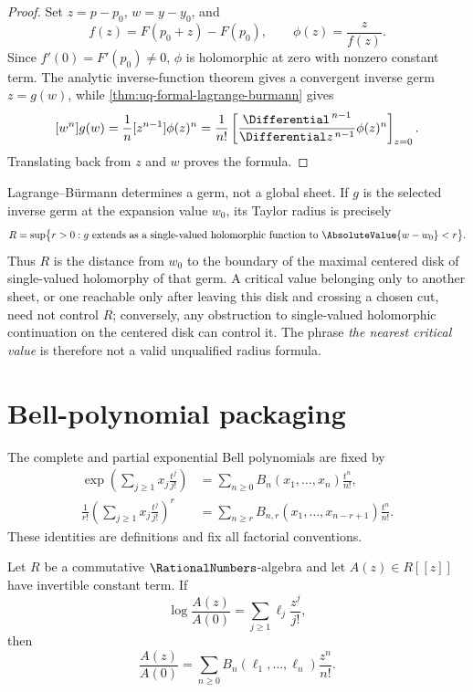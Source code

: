 \begin{proof}
Set \(z=p-p_0\), \(w=y-y_0\), and
\[
 f(z)=F(p_0+z)-F(p_0),\qquad \phi(z)=\frac{z}{f(z)}.
\]
Since \(f'(0)=F'(p_0)\ne0\), \(\phi\) is holomorphic at zero with nonzero
constant term.  The analytic inverse-function theorem gives a convergent
inverse germ \(z=g(w)\), while
\cref{thm:uq-formal-lagrange-burmann} gives
\[
 [w^n]g(w)=\frac1n[z^{n-1}]\phi(z)^n
 =\frac1{n!}\left[\frac{\Differential^{\,n-1}}{\Differential z^{\,n-1}}
 \phi(z)^n\right]_{z=0}.
\]
Translating back from \(z\) and \(w\) proves the formula.
\end{proof}

\begin{warning}
\label{warn:uq-inverse-radius}
Lagrange--B\"urmann determines a germ, not a global sheet.  If $g$ is the
selected inverse germ at the expansion value $w_0$, its Taylor radius is
precisely
\[
 R=\sup\bigl\{r>0:g\text{ extends as a single-valued holomorphic function to
 }\AbsoluteValue{w-w_0}<r\bigr\}.
\]
Thus $R$ is the distance from $w_0$ to the boundary of the maximal centered
disk of single-valued holomorphy of that germ.  A critical value belonging
only to another sheet, or one reachable only after leaving this disk and
crossing a chosen cut, need not control $R$; conversely, any obstruction to
single-valued holomorphic continuation on the centered disk can control it.
The phrase \emph{the nearest critical value} is therefore not a valid
unqualified radius formula.
\end{warning}

\section{Bell-polynomial packaging}
\label{sec:uq-bell-packaging}

The complete and partial exponential Bell polynomials are fixed by
\begin{align}
 \exp\!\left(\sum_{j\ge1}x_j\frac{t^j}{j!}\right)
 &=\sum_{n\ge0}B_n(x_1,\ldots,x_n)\frac{t^n}{n!},
 \label{eq:uq-complete-bell-definition}\\
 \frac1{r!}\left(\sum_{j\ge1}x_j\frac{t^j}{j!}\right)^{\!r}
 &=\sum_{n\ge r}B_{n,r}(x_1,\ldots,x_{n-r+1})
   \frac{t^n}{n!}.
 \label{eq:uq-partial-bell-definition}
\end{align}
These identities are definitions and fix all factorial conventions.

\begin{lemma}
\label{lem:uq-bell-exponentiation}
Let \(R\) be a commutative \(\RationalNumbers\)-algebra and let \(A(z)\in R[[z]]\) have
invertible constant term.  If
\[
 \log\frac{A(z)}{A(0)}
 =\sum_{j\ge1}\ell_j\frac{z^j}{j!},
\]
then
\[
 \frac{A(z)}{A(0)}
 =\sum_{n\ge0}B_n(\ell_1,\ldots,\ell_n)\frac{z^n}{n!}.
\]
\end{lemma}

